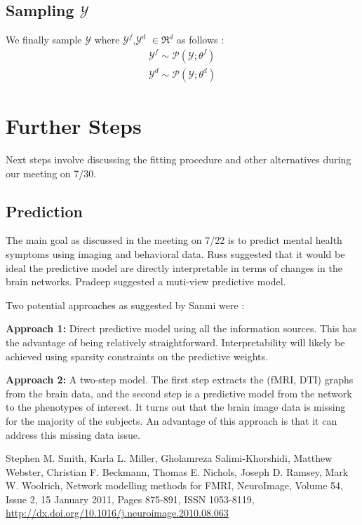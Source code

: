 \documentclass[a4paper,10pt]{article}
\begin{document}
\subsection{Sampling $\mathcal{Y}$}
We finally sample $\mathcal{Y}$ where $\mathcal{Y}^{f}$,$\mathcal{Y}^{d}$ $\in \Re^{d}$ as follows :
\begin{align*}
\mathcal{Y}^{f} \sim \mathcal{P}(\mathcal{Y};\theta^{f})\\
\mathcal{Y}^{d} \sim \mathcal{P}(\mathcal{Y};\theta^{d})
\end{align*}

  \section{Further Steps}
Next steps involve discussing the fitting procedure and other alternatives during our meeting on 7/30. 

\subsection{Prediction}
The main goal as discussed in the meeting on 7/22 is to predict mental health symptoms using imaging and behavioral data. Russ suggested that it would be ideal the predictive model are directly interpretable in terms of changes in the brain networks. Pradeep suggested a muti-view predictive model.

Two potential approaches as suggested by Sanmi were :

\textbf{Approach 1:} Direct predictive model using all the information sources. This has the advantage of being relatively straightforward. Interpretability will likely be achieved using sparsity constraints on the predictive weights.

\textbf{Approach 2: } A two-step model. The first step extracts the (fMRI, DTI) graphs from the brain data, and the second step is a predictive model from the network to the phenotypes of interest. It turns out that the brain image data is missing for the majority of the subjects. An advantage of this approach is that it can address this missing data issue. 

\begin{thebibliography}{99}
     Stephen M. Smith, Karla L. Miller, Gholamreza Salimi-Khorshidi, Matthew Webster, Christian F. Beckmann, Thomas E. Nichols, Joseph D. Ramsey, Mark W. Woolrich, Network modelling methods for FMRI, NeuroImage, Volume 54, Issue 2, 15 January 2011, Pages 875-891, ISSN 1053-8119, \url{http://dx.doi.org/10.1016/j.neuroimage.2010.08.063}

    
\end{thebibliography}
\end{document}
